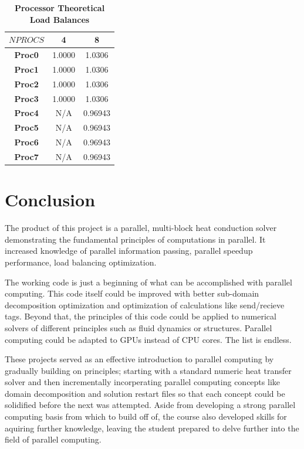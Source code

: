 \documentclass[twocolumn,10pt]{asme2ej}
\begin{document}
\vspace{-1.8em}
\begin{table}[htb]
\begin{center}
\caption{\textbf{Processor Theoretical Load Balances}}
\begin{tabular}{|c | c c|}
\hline
\textbf{$NPROCS$} & 4   & 8     \\
\hline
\textbf{Proc0}    & 1.0000 & 1.0306 \\
\textbf{Proc1}    & 1.0000 & 1.0306 \\
\textbf{Proc2}    & 1.0000 & 1.0306 \\
\textbf{Proc3}    & 1.0000 & 1.0306 \\
\textbf{Proc4}    & N/A    & 0.96943 \\
\textbf{Proc5}    & N/A    & 0.96943 \\
\textbf{Proc6}    & N/A    & 0.96943 \\
\textbf{Proc7}    & N/A    & 0.96943 \\
\hline
\end{tabular}
\label{Load}
\end{center}
\end{table}
\vspace{-2.3em}

\section{Conclusion}

The product of this project is a parallel, multi-block heat conduction solver demonstrating the fundamental principles of computations in parallel.  It increased knowledge of parallel information passing, parallel speedup performance, load balancing optimization.

The working code is just a beginning of what can be accomplished with parallel computing.  This code itself could be improved with better sub-domain decomposition optimization and optimization of calculations like send/recieve tags.  Beyond that, the principles of this code could be applied to numerical solvers of different principles such as fluid dynamics or structures.  Parallel computing could be adapted to GPUs instead of CPU cores.  The list is endless.

These projects served as an effective introduction to parallel computing by gradually building on principles; starting with a standard numeric heat transfer solver and then incrementally incorperating parallel computing concepts like domain decomposition and solution restart files so that each concept could be solidified before the next was attempted.  Aside from developing a strong parallel computing basis from which to build off of, the course also developed skills for aquiring further knowledge, leaving the student prepared to delve further into the field of parallel computing.
\end{document}
